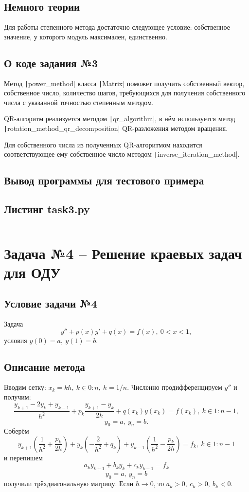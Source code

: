 \section{Немного теории}
Для работы степенного метода достаточно следующее условие: собственное значение, у которого модуль максимален, единственно.

\section{О коде задания №3}
 Метод \texttt|power_method| класса \texttt|Matrix| поможет получить собственный вектор, собственное число, количество шагов, требующихся для получения собственного числа с указанной точностью степенным методом.

 QR-алгоритм реализуется методом \texttt|qr_algorithm|, в нём используется метод \texttt|rotation_method_qr_decomposition| QR-разложения методом вращения.

 Для собственного числа из полученных QR-алгоритмом находится соответствующее ему собственное число методом \texttt|inverse_iteration_method|.

\section{Вывод программы для тестового примера}

\section{Листинг task3.py}
\inputminted{python}{code/task3.py}

\chapter{Задача №4 -- Решение краевых задач для ОДУ}
\section{Условие задачи №4}
Задача
$$y''+p(x)y'+q(x) = f(x),\ 0<x<1,$$
условия $y(0)=a,\ y(1) = b$.

\section{Описание метода}
Вводим сетку: $x_k=kh,\ k \in 0: n,\ h = 1/n.$ Численно продифференцируем $y''$ и получим:
$$\frac{y_{k+1}-2y_k+y_{k-1}}{h^2} + p_k\frac{y_{k+1}-y_k}{2h} + q(x_k)y(x_k) = f(x_k),\ k \in 1: n - 1,$$
$$y_0 = a,\ y_n = b.$$
Соберём
$$y_{k+1}(\frac{1}{h^2} + \frac{p_k}{2h}) + y_k (-\frac{2}{h^2} + q_k) + y_{k-1}(\frac{1}{h^2} - \frac{p_k}{2h})=f_k,\ k \in 1: n -1 $$
и перепишем 
$$a_ky_{k+1} + b_ky_k+c_ky_{k-1}=f_k$$
$$y_0 = a,\ y_n = b$$
получили трёхдиагональную матрицу. Если $h\rightarrow0$, то $a_k>0,\ c_k >0,\ b_k < 0.$

